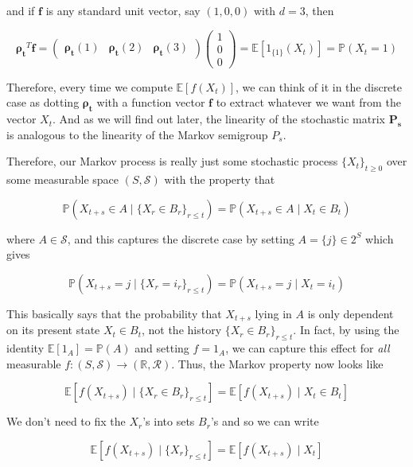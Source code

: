 \documentclass{article}
\begin{document}
    and if $\mathbf{f}$ is any standard unit vector, say $(1, 0, 0)$ with $d = 3$, then

      \[\boldsymbol{\rho_t}^T \mathbf{f}  = \begin{pmatrix} \boldsymbol{\rho_t} (1) & \boldsymbol{\rho_t} (2) & \boldsymbol{\rho_t} (3) \end{pmatrix} \begin{pmatrix} 1 \\ 0 \\ 0 \end{pmatrix}= \mathbb{E}[1_{\{1\}} (X_t)] = \mathbb{P}(X_t = 1)\]

    Therefore, every time we compute $\mathbb{E}[f(X_t)]$, we can think of it in the discrete case as dotting $\boldsymbol{\rho_t}$ with a function vector $\mathbf{f}$ to extract whatever we want from the vector $X_t$. And as we will find out later, the linearity of the stochastic matrix $\mathbf{P_s}$ is analogous to the linearity of the Markov semigroup $P_s$.  

    Therefore, our Markov process is really just some stochastic process $\{X_t\}_{t \geq 0}$ over some measurable space $(S, \mathcal{S})$ with the property that 

      \[\mathbb{P}(X_{t + s} \in A \mid \{X_r \in B_r\}_{r \leq t}) = \mathbb{P}( X_{t + s} \in A \mid X_t \in B_t)\]

    where $A \in \mathcal{S}$, and this captures the discrete case by setting $A = \{j\} \in 2^S$ which gives 

      \[\mathbb{P}( X_{t + s} = j \mid \{X_r = i_r\}_{r \leq t}) = \mathbb{P}( X_{t + s} = j \mid X_t = i_t)\]

    This basically says that the probability that $X_{t + s}$ lying in $A$ is only dependent on its present state $X_t \in B_t$, not the history $\{X_r \in B_r\}_{r \leq t}$. In fact, by using the identity $\mathbb{E}[1_A] = \mathbb{P}(A)$ and setting $f = 1_A$, we can capture this effect for \textit{all} measurable $f: (S, \mathcal{S}) \rightarrow (\mathbb{R}, \mathcal{R})$. Thus, the Markov property now looks like  

      \[\mathbb{E}[f (X_{t + s}) \mid \{X_r \in B_r\}_{r \leq t}] = \mathbb{E}[ f(X_{t + s}) \mid X_t \in B_t]\]

    We don't need to fix the $X_r$'s into sets $B_r$'s and so we can write 

      \[\mathbb{E}[f (X_{t + s}) \mid \{X_r\}_{r \leq t}] = \mathbb{E}[ f(X_{t + s}) \mid X_t]\]
\end{document}
